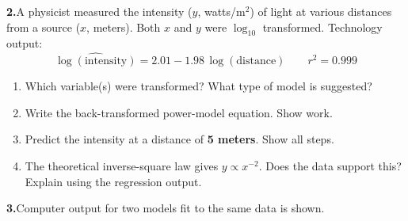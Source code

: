 \documentclass[10pt]{article}
\begin{document}
\vspace{0.18in}

\noindent\textbf{2.}\enspace A physicist measured the intensity ($y$, watts/m$^2$) of light
at various distances from a source ($x$, meters). Both $x$ and $y$ were $\log_{10}$
transformed. Technology output:
\[
  \widehat{\log(\text{intensity})} = 2.01 - 1.98\,\log(\text{distance}) \qquad r^2 = 0.999
\]

\begin{enumerate}[label=\textbf{(\alph*)}, leftmargin=2em, itemsep=0.18in]

  \item Which variable(s) were transformed? What type of model is suggested?\\[8pt]

  \item Write the back-transformed power-model equation. Show work.\\[8pt]

  \item Predict the intensity at a distance of \textbf{5 meters}. Show all steps.\\[8pt]

  \item The theoretical inverse-square law gives $y \propto x^{-2}$. Does the data support
        this? Explain using the regression output.\\[8pt]

\end{enumerate}

\vspace{0.18in}

\noindent\textbf{3.}\enspace Computer output for two models fit to the same data is shown.
\end{document}
